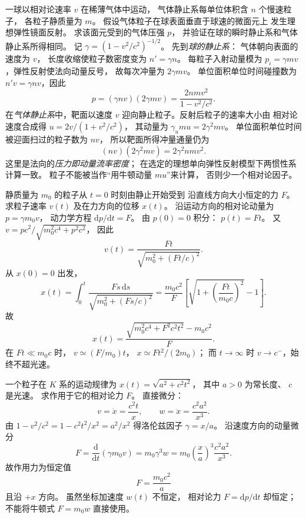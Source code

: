 一球以相对论速率 $v$ 在稀薄气体中运动，
气体静止系每单位体积含 $n$ 个慢速粒子，
各粒子静质量为 $m$。
假设气体粒子在球表面垂直于球速的微面元上
发生理想弹性镜面反射。
求该面元受到的气体压强 $p$，
并验证在球的瞬时静止系和气体静止系所得相同。
\exsolution
记 $\gamma=(1-v^2/c^2)^{-1/2}$。
先到\emph{球的静止系}：
气体朝向表面的速度为 $v$，
长度收缩使粒子数密度变为
$n'=\gamma n$。
每粒子入射动量模为
$p_i=\gamma mv$，弹性反射使法向动量反号，
故每次冲量为 $2\gamma mv$。
单位面积单位时间碰撞数为
$n'v=\gamma nv$，因此
\[
\boxed{p=(\gamma nv)(2\gamma mv)
=\frac{2nmv^2}{1-v^2/c^2}}.
\]
在\emph{气体静止系}中，靶面以速度 $v$
迎向静止粒子。反射后粒子的速率大小由
相对论速度合成得
$u=2v/(1+v^2/c^2)$，
其动量为
$\gamma_u m u=2\gamma^2mv$。
单位面积单位时间被迎面扫过的粒子数为 $nv$，
所以靶面所得冲量通量仍为
\[
(nv)(2\gamma^2mv)=2\gamma^2nmv^2.
\]
\excheck 这里是法向的\emph{压力即动量流率密度}；
在选定的理想单向弹性反射模型下两惯性系计算一致。
粒子不能被当作“用牛顿动量 $mu$”来计算，
否则少一个相对论因子。

静质量为 $m_0$ 的粒子从
$t=0$ 时刻由静止开始受到
沿直线方向大小恒定的力 $F$。
求粒子速率 $v(t)$ 及在力方向的位移 $x(t)$。
\exsolution
沿运动方向的相对论动量为
$p=\gamma m_0v$，
动力学方程 $\mathrm dp/\mathrm dt=F$。
由 $p(0)=0$ 积分：
$p(t)=Ft$。
又
$v=pc^2/\sqrt{m_0^2c^4+p^2c^2}$，
因此
\[
\boxed{v(t)=
\frac{F t}{\sqrt{m_0^2+(F t/c)^2}}}.
\]
从 $x(0)=0$ 出发，
\[
x(t)=\int_0^t\frac{F s\,\mathrm ds}
{\sqrt{m_0^2+(Fs/c)^2}}
=\frac{m_0c^2}{F}
\left[\sqrt{1+\left(\frac{F t}{m_0c}\right)^2}-1\right].
\]
故
\[
\boxed{x(t)=\frac{
\sqrt{m_0^2c^4+F^2c^2t^2}-m_0c^2}{F}}.
\]
\excheck 在 $Ft\ll m_0c$ 时，
$v\simeq(F/m_0)t$，
$x\simeq Ft^2/(2m_0)$；
而 $t\to\infty$ 时
$v\to c^-$，始终不超光速。

一个粒子在 $K$ 系的运动规律为
$x(t)=\sqrt{a^2+c^2t^2}$，
其中 $a>0$ 为常长度、
$c$ 是光速。
求作用于它的相对论力 $F$。
\exsolution
直接微分：
\[
v=\dot x=\frac{c^2t}{x},\qquad
w=\ddot x=\frac{c^2a^2}{x^3}.
\]
由
$1-v^2/c^2=1-c^2t^2/x^2=a^2/x^2$
得洛伦兹因子
$\gamma=x/a$。
沿速度方向的动量微分
\[
F=\frac{\mathrm d}{\mathrm dt}(\gamma m_0v)
=m_0\gamma^3 w
=m_0\left(\frac xa\right)^3
\frac{c^2a^2}{x^3}.
\]
故作用力为恒定值
\[
\boxed{F=\frac{m_0c^2}{a}}
\]
且沿 $+x$ 方向。
\excheck 虽然坐标加速度 $w(t)$ 不恒定，
相对论力 $F=\mathrm dp/\mathrm dt$ 却恒定；
不能将牛顿式 $F=m_0w$ 直接使用。

